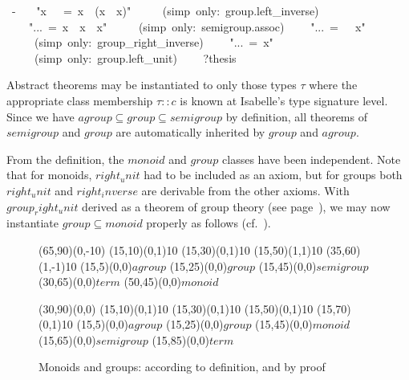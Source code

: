 \begin{isabelle}
~-\isanewline
~~~{"}x~{\isasymOtimes}~{\isasymunit}~=~x~{\isasymOtimes}~(x{\isasyminv}~{\isasymOtimes}~x){"}\isanewline
~~~~~(simp~only:~group.left\_inverse)\isanewline
~~~~{"}...~=~x~{\isasymOtimes}~x{\isasyminv}~{\isasymOtimes}~x{"}\isanewline
~~~~~(simp~only:~semigroup.assoc)\isanewline
~~~~{"}...~=~{\isasymunit}~{\isasymOtimes}~x{"}\isanewline
~~~~~(simp~only:~group\_right\_inverse)\isanewline
~~~~{"}...~=~x{"}\isanewline
~~~~~(simp~only:~group.left\_unit)\isanewline
~~~~?thesis~\isanewline
{}%
\begin{isamarkuptext}%
\medskip Abstract theorems may be instantiated to only those types
 $\tau$ where the appropriate class membership $\tau :: c$ is known at
 Isabelle's type signature level.  Since we have $agroup \subseteq
 group \subseteq semigroup$ by definition, all theorems of $semigroup$
 and $group$ are automatically inherited by $group$ and $agroup$.%
\end{isamarkuptext}%
%
%
\begin{isamarkuptext}%
From the definition, the $monoid$ and $group$ classes have been
 independent.  Note that for monoids, $right_unit$ had to be included
 as an axiom, but for groups both $right_unit$ and $right_inverse$ are
 derivable from the other axioms.  With $group_right_unit$ derived as
 a theorem of group theory (see page~\pageref{thm:group-right-unit}),
 we may now instantiate $group \subseteq monoid$ properly as follows
 (cf.\ ).

 \begin{figure}[htbp]
   \begin{center}
     \small
     \unitlength 0.6mm
     \begin{picture}(65,90)(0,-10)
       \put(15,10){\line(0,1){10}} \put(15,30){\line(0,1){10}}
       \put(15,50){\line(1,1){10}} \put(35,60){\line(1,-1){10}}
       \put(15,5){\makebox(0,0){$agroup$}}
       \put(15,25){\makebox(0,0){$group$}}
       \put(15,45){\makebox(0,0){$semigroup$}}
       \put(30,65){\makebox(0,0){$term$}} \put(50,45){\makebox(0,0){$monoid$}}
     \end{picture}
     \hspace{4em}
     \begin{picture}(30,90)(0,0)
       \put(15,10){\line(0,1){10}} \put(15,30){\line(0,1){10}}
       \put(15,50){\line(0,1){10}} \put(15,70){\line(0,1){10}}
       \put(15,5){\makebox(0,0){$agroup$}}
       \put(15,25){\makebox(0,0){$group$}}
       \put(15,45){\makebox(0,0){$monoid$}}
       \put(15,65){\makebox(0,0){$semigroup$}}
       \put(15,85){\makebox(0,0){$term$}}
     \end{picture}
     \caption{Monoids and groups: according to definition, and by proof}
     \label{fig:monoid-group}
   \end{center}
 \end{figure}


\end{isamarkuptext}
\end{isabelle}
